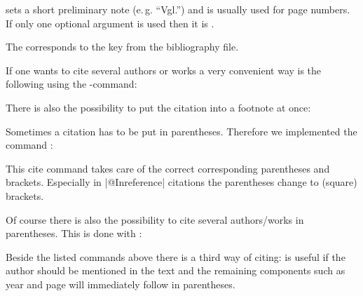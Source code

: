 \documentclass[a4paper,
10pt,
ngerman,
english
]{ltxdoc}
\begin{document}
 sets a short preliminary note (e.\,g. \enquote{Vgl.}) and  is usually used for page numbers.
If only one optional argument is used then it is .
The  corresponds to the key from the bibliography file.

\DescribeMacro{\cites}
If one wants to cite several authors or works a very convenient way is the following using the -command:
 
 \DescribeMacro{\footcite}
 There is also the possibility to put the citation into a footnote at once:

\DescribeMacro{\parencite}
Sometimes a citation has to be put in parentheses. 
Therefore we implemented the command :
This cite command takes care of the correct corresponding parentheses and brackets.
Especially in |@Inreference| citations the parentheses  change to (square) brackets.


\DescribeMacro{\parencites}
Of course there is also the possibility to cite several authors/works in parentheses.
This is done with :
 
\DescribeMacro{\textcite}
Beside the listed  commands above there is a third way of citing:
 is useful if the author should be mentioned in the text and
the remaining components such as year and page will immediately follow in parentheses. 
\end{document}

